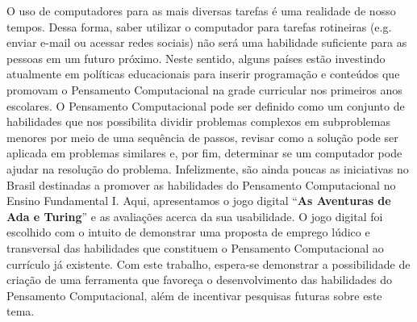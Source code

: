 O uso de computadores para as mais diversas tarefas é uma realidade de nosso tempos. Dessa forma, saber utilizar o computador para tarefas rotineiras (e.g. enviar e-mail ou acessar redes sociais) não será uma habilidade suficiente para as pessoas em um futuro próximo. Neste sentido, alguns países estão investindo atualmente em políticas educacionais para inserir programação e conteúdos que promovam o Pensamento Computacional na grade curricular nos primeiros anos escolares. O Pensamento Computacional pode ser definido como um conjunto de habilidades que nos possibilita dividir problemas complexos em subproblemas menores por meio de uma sequência de passos, revisar como a solução pode ser aplicada em problemas similares e, por fim, determinar se um computador pode ajudar na resolução do problema. Infelizmente, são ainda poucas as iniciativas no Brasil destinadas a promover as habilidades do Pensamento Computacional  no Ensino Fundamental I. Aqui, apresentamos o jogo digital “\textbf{As Aventuras de Ada e Turing}” e as avaliações acerca da sua usabilidade. O jogo digital foi escolhido com o intuito de demonstrar uma proposta de emprego lúdico e transversal das habilidades que constituem o Pensamento Computacional ao currículo já existente. Com este trabalho, espera-se demonstrar a possibilidade de criação de uma ferramenta que favoreça o desenvolvimento das habilidades do Pensamento Computacional, além de incentivar pesquisas futuras sobre este tema.